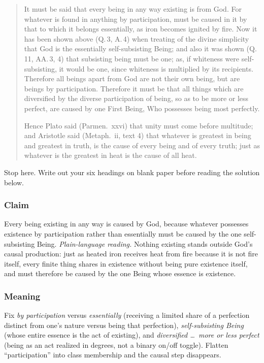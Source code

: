 \begin{quote}
It must be said that every being in any way existing is from God. For whatever is found in anything by participation, must be caused in it by that to which it belongs essentially, as iron becomes ignited by fire. Now it has been shown above (Q.\,3, A.\,4) when treating of the divine simplicity that God is the essentially self-subsisting Being; and also it was shown (Q.\,11, AA.\,3, 4) that subsisting being must be one; as, if whiteness were self-subsisting, it would be one, since whiteness is multiplied by its recipients. Therefore all beings apart from God are not their own being, but are beings by participation. Therefore it must be that all things which are diversified by the diverse participation of being, so as to be more or less perfect, are caused by one First Being, Who possesses being most perfectly.

Hence Plato said (Parmen.\ xxvi) that unity must come before multitude; and Aristotle said (Metaph.\ ii, text 4) that whatever is greatest in being and greatest in truth, is the cause of every being and of every truth; just as whatever is the greatest in heat is the cause of all heat.
\end{quote}

Stop here. Write out your six headings on blank paper before reading the solution below.

\subsubsection*{Claim}

Every being existing in any way is caused by God, because whatever possesses existence by participation rather than essentially must be caused by the one self-subsisting Being. \emph{Plain-language reading.} Nothing existing stands outside God's causal production: just as heated iron receives heat from fire because it is not fire itself, every finite thing shares in existence without being pure existence itself, and must therefore be caused by the one Being whose essence is existence.

\subsubsection*{Meaning}

Fix \emph{by participation} versus \emph{essentially} (receiving a limited share of a perfection distinct from one's nature versus being that perfection), \emph{self-subsisting Being} (whose entire essence is the act of existing), and \emph{diversified \dots\ more or less perfect} (being as an act realized in degrees, not a binary on/off toggle). Flatten ``participation'' into class membership and the causal step disappears.


